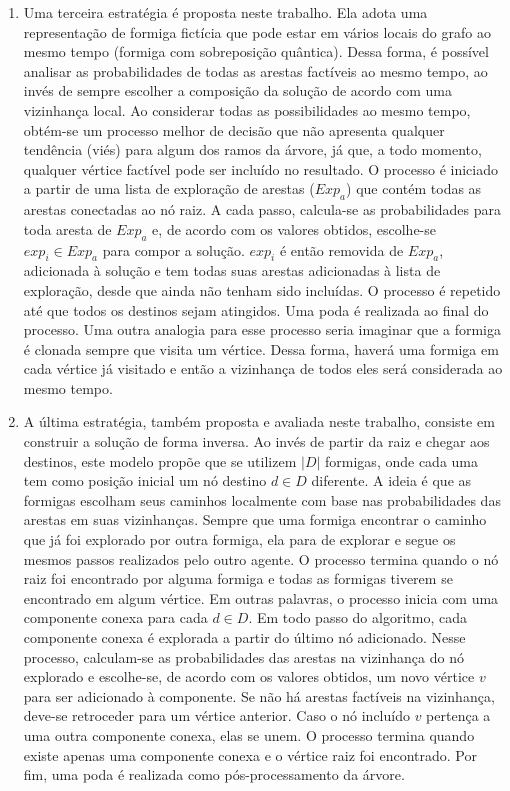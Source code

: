 \begin{enumerate}
	\item Uma terceira estratégia é proposta neste trabalho. Ela adota uma representação de formiga fictícia que pode estar em vários locais do grafo ao mesmo tempo (formiga com sobreposição quântica). Dessa forma, é possível analisar as probabilidades de todas as arestas factíveis ao mesmo tempo, ao invés de sempre escolher a composição da solução de acordo com uma vizinhança local. Ao considerar todas as possibilidades ao mesmo tempo, obtém-se um processo melhor de decisão que não apresenta qualquer tendência (viés) para algum dos ramos da árvore, já que, a todo momento, qualquer vértice factível pode ser incluído no resultado. O processo é iniciado a partir de uma lista de exploração de arestas ($Exp_a$) que contém todas as arestas conectadas ao nó raiz. A cada passo, calcula-se as probabilidades para toda aresta de $Exp_a$ e, de acordo com os valores obtidos, escolhe-se $exp_i \in Exp_a$ para compor a solução. $exp_i$ é então removida de $Exp_a$, adicionada à solução e tem todas suas arestas adicionadas à lista de exploração, desde que ainda não tenham sido incluídas. O processo é repetido até que todos os destinos sejam atingidos. Uma poda é realizada ao final do processo. Uma outra analogia para esse processo seria imaginar que a formiga é clonada sempre que visita um vértice. Dessa forma, haverá uma formiga em cada vértice já visitado e então a vizinhança de todos eles será considerada ao mesmo tempo.
	\item A última estratégia, também proposta e avaliada neste trabalho, consiste em construir a solução de forma inversa. Ao invés de partir da raiz e chegar aos destinos, este modelo propõe que se utilizem $|D|$ formigas, onde cada uma tem como posição inicial um nó destino $d \in D$ diferente. A ideia é que as formigas escolham seus caminhos localmente com base nas probabilidades das arestas em suas vizinhanças. Sempre que uma formiga encontrar o caminho que já foi explorado por outra formiga, ela para de explorar e segue os mesmos passos realizados pelo outro agente. O processo termina quando o nó raiz foi encontrado por alguma formiga e todas as formigas tiverem se encontrado em algum vértice. Em outras palavras, o processo inicia com uma componente conexa para cada $d \in D$. Em todo passo do algoritmo, cada componente conexa é explorada a partir do último nó adicionado. Nesse processo, calculam-se as probabilidades das arestas na vizinhança do nó explorado e escolhe-se, de acordo com os valores obtidos, um novo vértice $v$ para ser adicionado à componente. Se não há arestas factíveis na vizinhança, deve-se retroceder para um vértice anterior. Caso o nó incluído $v$ pertença a uma outra componente conexa, elas se unem. O processo termina quando existe apenas uma componente conexa e o vértice raiz foi encontrado. Por fim, uma poda é realizada como pós-processamento da árvore. 
\end{enumerate}

